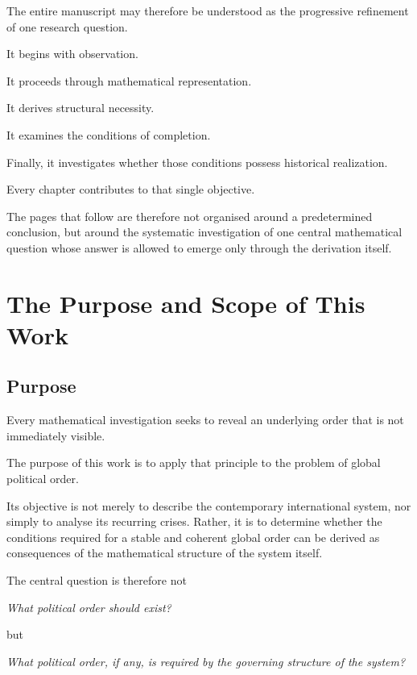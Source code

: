 \documentclass[11pt,openany]{book}
\theoremstyle{plain}
\theoremstyle{definition}
\begin{document}
The entire manuscript may therefore be understood as the progressive refinement of one research question.

It begins with observation.

It proceeds through mathematical representation.

It derives structural necessity.

It examines the conditions of completion.

Finally, it investigates whether those conditions possess historical realization.

Every chapter contributes to that single objective.

The pages that follow are therefore not organised around a predetermined conclusion, but around the systematic investigation of one central mathematical question whose answer is allowed to emerge only through the derivation itself.
\chapter*{The Purpose and Scope of This Work}


\section*{Purpose}

Every mathematical investigation seeks to reveal an underlying order that is not immediately visible.

The purpose of this work is to apply that principle to the problem of global political order.

Its objective is not merely to describe the contemporary international system, nor simply to analyse its recurring crises. Rather, it is to determine whether the conditions required for a stable and coherent global order can be derived as consequences of the mathematical structure of the system itself.

The central question is therefore not

\begin{center}
\emph{What political order should exist?}
\end{center}

but

\begin{center}
\emph{What political order, if any, is required by the governing structure of the system?}
\end{center}
\end{document}
